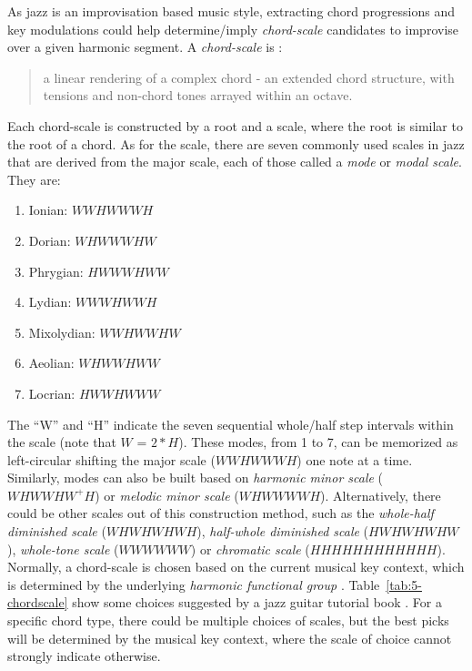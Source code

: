 As jazz is an improvisation based music style, extracting chord progressions and key modulations could help determine/imply {\it chord-scale} candidates to improvise over a given harmonic segment. A {\it chord-scale} is \cite{hojnackijazz}:
\begin{quote}
a linear rendering of a complex chord - an extended chord structure, with tensions and non-chord tones arrayed within an octave.
\end{quote}
Each chord-scale is constructed by a root and a scale, where the root is similar to the root of a chord. As for the scale, there are seven commonly used scales in jazz that are derived from the major scale, each of those called a {\it mode} or {\it modal scale}. They are:
\begin{enumerate}
\item Ionian: $WWHWWWH$
\item Dorian: $WHWWWHW$
\item Phrygian: $HWWWHWW$
\item Lydian: $WWWHWWH$
\item Mixolydian: $WWHWWHW$
\item Aeolian: $WHWWHWW$
\item Locrian: $HWWHWWW$
\end{enumerate}
The ``W'' and ``H'' indicate the seven sequential whole/half step intervals within the scale (note that $W$ = $2*H$). These modes, from 1 to 7, can be memorized as left-circular shifting the major scale ($WWHWWWH$) one note at a time. Similarly, modes can also be built based on {\it harmonic minor scale} ($WHWWHW^+H$) or {\it melodic minor scale} ($WHWWWWH$). Alternatively, there could be other scales out of this construction method, such as the {\it whole-half diminished scale} ($WHWHWHWH$), {\it half-whole diminished scale} ($HWHWHWHW$), {\it whole-tone scale} ($WWWWWW$) or {\it chromatic scale} ($HHHHHHHHHHHH$). Normally, a chord-scale is chosen based on the current musical key context, which is determined by the underlying {\it harmonic functional group} \cite{hojnackijazz,levine2011jazztheory}. Table~\ref{tab:5-chordscale} show some choices suggested by a jazz guitar tutorial book \cite{jazzguitarbook}. For a specific chord type, there could be multiple choices of scales, but the best picks will be determined by the musical key context, where the scale of choice cannot strongly indicate otherwise.
